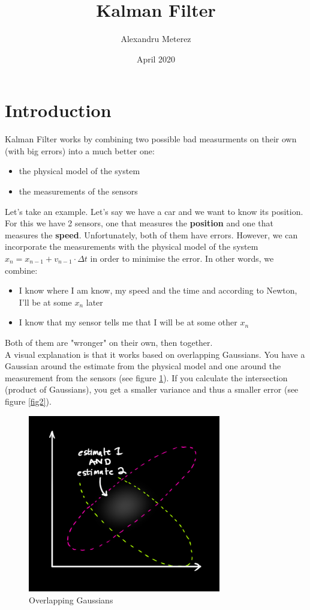 \documentclass{article}
\title{Kalman Filter}
\author{Alexandru Meterez}
\date{April 2020}
\begin{document}
\maketitle

\section{Introduction}
Kalman Filter works by combining two possible bad measurments on their own (with big errors) into a much better one:
\begin{itemize}
    \item the physical model of the system
    \item the measurements of the sensors
\end{itemize}
Let's take an example. Let's say we have a car and we want to know its position. For this we have 2 sensors, one that measures the \textbf{position} and one that measures the \textbf{speed}. Unfortunately, both of them have errors. However, we can incorporate the measurements with the physical model of the system $x_n = x_{n-1} + v_{n-1} \cdot \Delta t$ in order to minimise the error. In other words, we combine:
\begin{itemize}
    \item I know where I am know, my speed and the time and according to Newton, I'll be at some $x_n$ later
    \item I know that my sensor tells me that I will be at some other $x_n$
\end{itemize} 
Both of them are "wronger" on their own, then together. \\
A visual explanation is that it works based on overlapping Gaussians. You have a Gaussian around the estimate from the physical model and one around the measurement from the sensors (see figure \ref{fig1}). If you calculate the intersection (product of Gaussians), you get a smaller variance and thus a smaller error (see figure \ref{fig2}).
\begin{figure}[b]
    \includegraphics[width=0.75\textwidth]{pic2.png}
    \centering
    \caption{Overlapping Gaussians}
    \label{fig1}
\end{figure}
\end{document}

